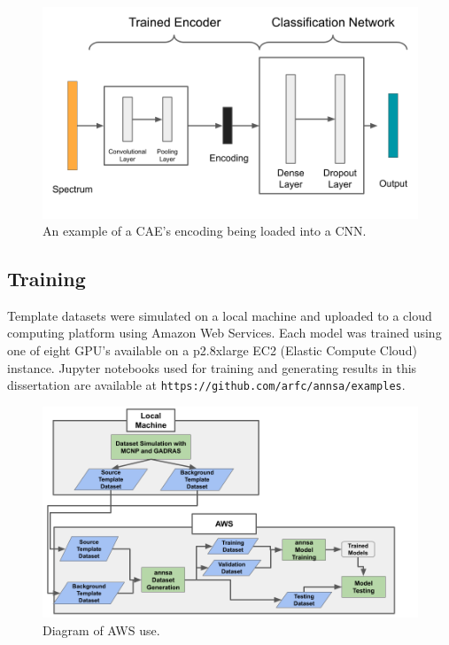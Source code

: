 \begin{figure}[H]
\centering
\includegraphics[trim=0 0 0 0,clip,width=0.9\linewidth]{images/annsa_caednn.png}
\caption{An example of a CAE's encoding being loaded into a CNN.}
\label{fig:annsa_caednn}
\end{figure}


\subsection{Training}

Template datasets were simulated on a local machine and uploaded to a cloud computing platform using Amazon Web Services. Each model was trained using one of eight GPU's available on a p2.8xlarge EC2 (Elastic Compute Cloud) instance. Jupyter notebooks used for training and generating results in this dissertation are available at \verb|https://github.com/arfc/annsa/examples|.

\begin{figure}[H]
	\centering
	\includegraphics[trim=0 0 20 0,clip,width=1.0\linewidth]{images/local_cloud_diagram.png}
	\caption{Diagram of AWS use.}
	\label{fig:local_cloud_diagram}
\end{figure}




